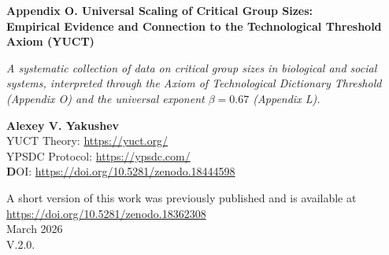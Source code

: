 \documentclass[12pt]{article}
\theoremstyle{remark}
\begin{document}
	
	\begin{titlepage}
		\begin{center}
			\vspace*{0.5cm}
			\Huge\textbf{Appendix O. Universal Scaling of Critical Group Sizes: \\ Empirical Evidence and Connection to the Technological Threshold Axiom (YUCT)}
			
			\vspace{0.3cm}
			\small\textit{A systematic collection of data on critical group sizes in biological and social systems, interpreted through the Axiom of Technological Dictionary Threshold (Appendix O) and the universal exponent $\beta = 0.67$ (Appendix L).}
			
			\vspace{0.3cm}
			\small\textbf{Alexey V. Yakushev} \\
	YUCT Theory: \url{https://yuct.org/}\\
YPSDC Protocol: \url{https://ypsdc.com/}\\


\vspace{2cm}
\textbf DOI: \url{https://doi.org/10.5281/zenodo.18444598}\\

\vspace{1cm}

\vspace{0cm}
\large 
A short version of this work was previously published and is available at\\ \url{https://doi.org/10.5281/zenodo.18362308}\\
\vspace{1cm}
March 2026 \\ \large V.2.0.
			
			\vspace{0.5cm}
			\begin{minipage}{0.95\textwidth}
				\begin{abstract}
					\noindent
					This appendix compiles empirical data on the critical sizes at which various collective systems undergo a phase transition – such as swarming, fission, or structural reorganization. Systems examined include honeybee colonies, military units, fish schools, dolphin pods, livestock populations, and primate groups. Using the universal error‑scaling law $\varepsilon \propto N^{\beta}$ with $\beta = 0.67$ (Appendix L) and the Axiom of Technological Dictionary Threshold (Appendix O), we derive a quantitative relation between the critical size $N_{\text{crit}}$ at which a transition occurs and the optimal group size $N_{\text{opt}}$. The observed ratios $N_{\text{crit}}/N_{\text{opt}}$ for diverse systems cluster around values consistent with $\beta = 0.67$, providing independent support for the universality of this exponent and for the idea that crossing a technological (or organizational) threshold corresponds to a phase transition in coordination efficiency. We also propose specific, testable predictions for future experiments and field studies that can further validate the YUCT framework.
				\end{abstract}
			\end{minipage}
			

\end{center}
\end{titlepage}
\end{document}
